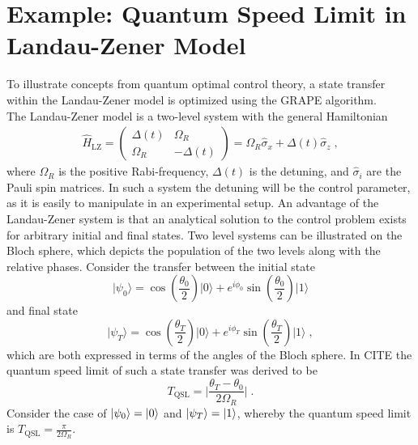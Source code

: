 \chapter{Example: Quantum Speed Limit in Landau-Zener Model} \label{chap:LZexample}
To illustrate concepts from quantum optimal control theory, a state transfer within the Landau-Zener model is optimized using the GRAPE algorithm.\\
The Landau-Zener model is a two-level system with the general Hamiltonian
\begin{align}
	\hat{H}_{\mathrm{LZ}} = \begin{pmatrix}
    	 \Delta (t) & \Omega_R    \\
         \Omega_R & -\Delta (t) 		
    \end{pmatrix}  = \Omega_R \hat{\sigma}_x + \Delta (t) \hat{\sigma}_z \; , \label{eq:LZhamiltonian}
\end{align}
where $\Omega_R$ is the positive Rabi-frequency, $\Delta (t)$ is the detuning, and $\hat{\sigma}_i$ are the Pauli spin matrices. In such a system the detuning will be the control parameter, as it is easily to manipulate in an experimental setup. An advantage of the Landau-Zener system is that an analytical solution to the control problem exists for arbitrary initial and final states. Two level systems can be illustrated on the Bloch sphere, which depicts the population of the two levels along with the relative phases. Consider the transfer between the initial state
\begin{equation}
\lvert \psi_0 \rangle = \cos{\left(\frac{\theta_0}{2}\right)} \lvert 0 \rangle + e^{i\phi_0}\sin{\left(\frac{\theta_0}{2}\right)}\lvert 1 \rangle 
\end{equation}
and final state
\begin{equation}
\lvert \psi_T \rangle = \cos{\left(\frac{\theta_T}{2}\right)} \lvert 0 \rangle + e^{i\phi_T}\sin{\left(\frac{\theta_T}{2}\right)}\lvert 1 \rangle \; ,
\end{equation}
which are both expressed in terms of the angles of the Bloch sphere.
In CITE the quantum speed limit of such a state transfer was derived to be 
\begin{equation}
	T_{\mathrm{QSL}} = \lvert \frac{\theta_T - \theta_0}{2 \Omega_R} \rvert \; . 
\end{equation}
Consider the case of $\ket{\psi_0} = \ket{0}$ and $\ket{\psi_T} = \ket{1}$, whereby the quantum speed limit is $T_{\mathrm{QSL}} = \frac{\pi}{2 \Omega_R}$. 

